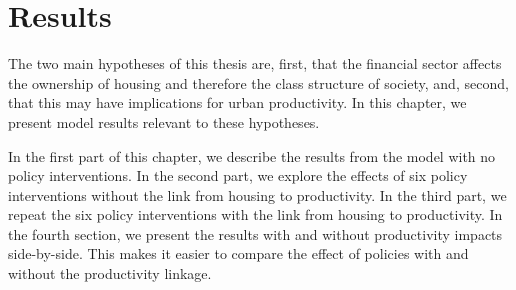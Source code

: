 \chapter{Results} \label{chapter-results}

The two main hypotheses of this thesis are, first, that the financial sector affects the ownership of housing and therefore the class structure of society, and, second, that this may have implications for urban productivity.  In this chapter, we present model results relevant to these hypotheses.

In the first part of this chapter, we describe the results from the model with no policy interventions. In the second part, we explore the effects of six policy interventions without the link from housing to productivity. In the third part, we repeat the six policy interventions with the link from housing to productivity.  %
In the fourth section, we present the results with and without productivity impacts side-by-side. This makes it easier to compare the effect of policies with and without the productivity linkage. 

